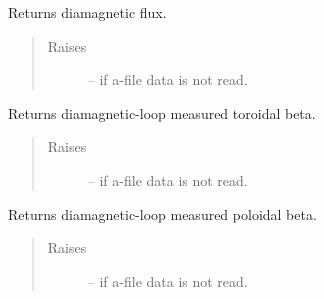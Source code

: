 \documentclass[letterpaper,10pt,english]{sphinxmanual}
\begin{document}
\begin{fulllineitems}
\begin{fulllineitems}
\begin{quote}
\begin{description}
\end{description}\end{quote}

\end{fulllineitems}


\begin{fulllineitems}
\label{eqtools:eqtools.eqdskreader.EqdskReader.getDiamagFlux}
Returns diamagnetic flux.
\begin{quote}\begin{description}
\item[{Raises}] \leavevmode
{} -- if a-file data is not read.

\end{description}\end{quote}

\end{fulllineitems}


\begin{fulllineitems}
\label{eqtools:eqtools.eqdskreader.EqdskReader.getDiamagBetaT}
Returns diamagnetic-loop measured toroidal beta.
\begin{quote}\begin{description}
\item[{Raises}] \leavevmode
{} -- if a-file data is not read.

\end{description}\end{quote}

\end{fulllineitems}


\begin{fulllineitems}
\label{eqtools:eqtools.eqdskreader.EqdskReader.getDiamagBetaP}
Returns diamagnetic-loop measured poloidal beta.
\begin{quote}\begin{description}
\item[{Raises}] \leavevmode
{} -- if a-file data is not read.

\end{description}\end{quote}


\end{fulllineitems}
\end{fulllineitems}
\end{document}
